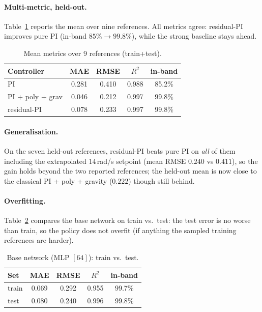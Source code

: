 \documentclass[10pt,twocolumn]{article}
\begin{document}
\paragraph{Multi-metric, held-out.} Table~\ref{tab:scorecard} reports the
mean over nine references. All metrics agree: residual-PI improves pure
PI (in-band $85\%\!\to\!99.8\%$), while the strong baseline stays ahead.

\begin{table}[h]
\centering
\caption{Mean metrics over 9 references (train+test).}
\label{tab:scorecard}
\small
\begin{tabular}{lcccc}
\toprule
\textbf{Controller} & \textbf{MAE} & \textbf{RMSE} & \textbf{$R^2$} & \textbf{in-band}\\
\midrule
PI               & 0.281 & 0.410 & 0.988 & 85.2\% \\
\rowcolor{bestrow}
PI + poly + grav & 0.046 & 0.212 & 0.997 & 99.8\% \\
residual-PI      & 0.078 & 0.233 & 0.997 & 99.8\% \\
\bottomrule
\end{tabular}
\end{table}

\paragraph{Generalisation.} On the seven held-out references,
residual-PI beats pure PI on \emph{all} of them including the
extrapolated $14$\,rad/s setpoint (mean RMSE $0.240$ vs $0.411$), so the
gain holds beyond the two reported references; the held-out mean is now
close to the classical PI + poly + gravity ($0.222$) though still behind.

\paragraph{Overfitting.} Table~\ref{tab:traintest} compares the base
network on train vs.\ test: the test error is no worse than train, so
the policy does not overfit (if anything the sampled training references
are harder).

\begin{table}[h]
\centering
\caption{Base network (MLP $[64]$): train vs.\ test.}
\label{tab:traintest}
\small
\begin{tabular}{lcccc}
\toprule
\textbf{Set} & \textbf{MAE} & \textbf{RMSE} & \textbf{$R^2$} & \textbf{in-band}\\
\midrule
train & 0.069 & 0.292 & 0.955 & 99.7\% \\
test  & 0.080 & 0.240 & 0.996 & 99.8\% \\
\bottomrule
\end{tabular}
\end{table}
\end{document}
